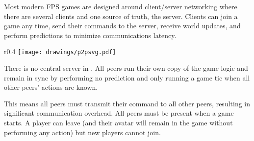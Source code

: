 Most modern FPS games are designed around client/server networking where there are several clients and one source of truth, the server. Clients can join a game any time, send their commands to the server, receive world updates, and perform predictions to minimize communications latency.\\
\par
\begin{wrapfigure}[12]{r}{0.4\textwidth}
\centering
\texttt{[image: drawings/p2psvg.pdf]}
\end{wrapfigure}
There is no central server in \doom. All peers run their own copy of the game logic and remain in sync by performing no prediction and only running a game tic when all other peers' actions are known.\\
\par
 This means all peers must transmit their command to all other peers, resulting in significant communication overhead. 
All peers must be present when a game starts. A player can leave (and their avatar will remain in the game without performing any action) but new players cannot join.
\pagebreak





